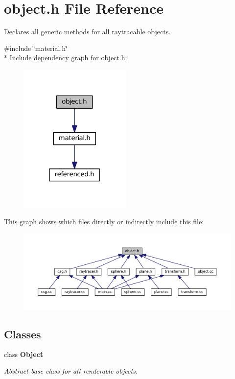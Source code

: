 \section{object.\+h File Reference}
\label{object_8h}


Declares all generic methods for all raytracable objects.  


{\ttfamily \#include \char`\"{}material.\+h\char`\"{}}\\*
Include dependency graph for object.\+h\+:
\nopagebreak
\begin{figure}[H]
\begin{center}
\leavevmode
\includegraphics[width=157pt]{object_8h__incl}
\end{center}
\end{figure}
This graph shows which files directly or indirectly include this file\+:
\nopagebreak
\begin{figure}[H]
\begin{center}
\leavevmode
\includegraphics[width=350pt]{object_8h__dep__incl}
\end{center}
\end{figure}
\subsection*{Classes}
\begin{DoxyCompactItemize}
\item 
class {\bf Object}
\begin{DoxyCompactList}\small\item\em Abstract base class for all renderable objects. \end{DoxyCompactList}\end{DoxyCompactItemize}

